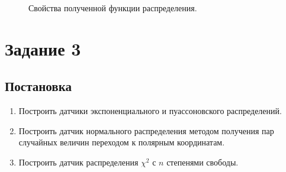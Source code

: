 \documentclass[12pt, a4paper]{article}
\begin{document}
\begin{figure}[H]
\caption{Свойства полученной функции распределения.}
\end{figure}

\newpage

\section{Задание 3}
\subsection{Постановка}
\begin{enumerate}
\item Построить датчики экспоненциального и пуассоновского распределений.
\item Построить датчик нормального распределения методом получения пар случайных величин переходом к полярным координатам.
\item Построить датчик распределения $\chi^2$ с $n$ степенями свободы.
\end{enumerate}
\end{document}
